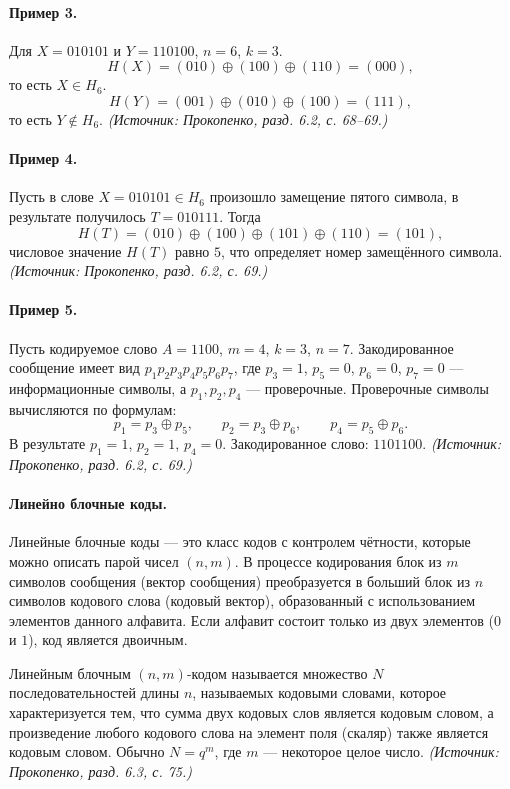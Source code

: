 \documentclass[a4paper,12pt]{article}
\begin{document}
\paragraph{Пример 3.}
Для \(X=010101\) и \(Y=110100\), \(n=6\), \(k=3\).
\[
H(X)=(010)\oplus(100)\oplus(110)=(000),
\]
то есть \(X\in H_6\).
\[
H(Y)=(001)\oplus(010)\oplus(100)=(111),
\]
то есть \(Y\notin H_6\).
\textit{(Источник: Прокопенко, разд. 6.2, с. 68--69.)}

\paragraph{Пример 4.}
Пусть в слове \(X=010101\in H_6\) произошло замещение пятого символа, в результате получилось \(T=010111\). Тогда
\[
H(T)=(010)\oplus(100)\oplus(101)\oplus(110)=(101),
\]
числовое значение \(H(T)\) равно \(5\), что определяет номер замещённого символа.
\textit{(Источник: Прокопенко, разд. 6.2, с. 69.)}

\paragraph{Пример 5.}
Пусть кодируемое слово \(A=1100\), \(m=4\), \(k=3\), \(n=7\). Закодированное сообщение имеет вид \(p_1p_2p_3p_4p_5p_6p_7\), где \(p_3=1\), \(p_5=0\), \(p_6=0\), \(p_7=0\) — информационные символы, а \(p_1,p_2,p_4\) — проверочные. Проверочные символы вычисляются по формулам:
\[
p_1=p_3\oplus p_5,\qquad p_2=p_3\oplus p_6,\qquad p_4=p_5\oplus p_6.
\]
В результате \(p_1=1\), \(p_2=1\), \(p_4=0\). Закодированное слово: \(1101100\).
\textit{(Источник: Прокопенко, разд. 6.2, с. 69.)}

\paragraph{Линейно блочные коды.}
Линейные блочные коды — это класс кодов с контролем чётности, которые можно описать парой чисел \((n,m)\). В процессе кодирования блок из \(m\) символов сообщения (вектор сообщения) преобразуется в больший блок из \(n\) символов кодового слова (кодовый вектор), образованный с использованием элементов данного алфавита. Если алфавит состоит только из двух элементов (\(0\) и \(1\)), код является двоичным.

Линейным блочным \((n,m)\)-кодом называется множество \(N\) последовательностей длины \(n\), называемых кодовыми словами, которое характеризуется тем, что сумма двух кодовых слов является кодовым словом, а произведение любого кодового слова на элемент поля (скаляр) также является кодовым словом. Обычно \(N=q^m\), где \(m\) — некоторое целое число.
\textit{(Источник: Прокопенко, разд. 6.3, с. 75.)}
\end{document}

